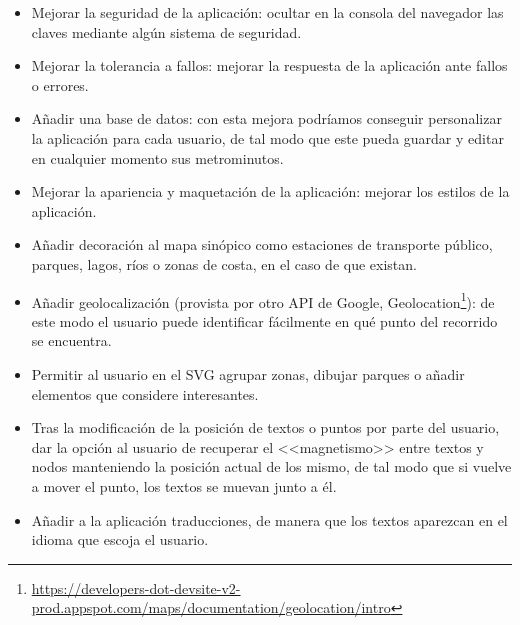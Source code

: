 \begin{itemize}
	\item Mejorar la seguridad de la aplicación: ocultar en la consola del navegador las claves mediante algún sistema de seguridad.
	\item Mejorar la tolerancia a fallos: mejorar la respuesta de la aplicación ante fallos o errores.
	\item Añadir una base de datos: con esta mejora podríamos conseguir personalizar la aplicación para cada usuario, de tal modo que este pueda guardar y editar en cualquier momento sus metrominutos.
	\item Mejorar la apariencia y maquetación de la aplicación: mejorar los estilos de la aplicación.
	\item Añadir decoración al mapa sinópico como estaciones de transporte público, parques, lagos, ríos o zonas de costa, en el caso de que existan.
	\item Añadir geolocalización (provista por otro API de Google, Geolocation\footnote{\url{https://developers-dot-devsite-v2-prod.appspot.com/maps/documentation/geolocation/intro}}): de este modo el usuario puede identificar fácilmente en qué punto del recorrido se encuentra.
	\item Permitir al usuario en el SVG agrupar zonas, dibujar parques o añadir elementos que considere interesantes.
	\item Tras la modificación de la posición de textos o puntos por parte del usuario, dar la opción al usuario de recuperar el <<magnetismo>> entre textos y nodos manteniendo la posición actual de los mismo, de tal modo que si vuelve a mover el punto, los textos se muevan junto a él.
	\item Añadir a la aplicación traducciones, de manera que los textos aparezcan en el idioma que escoja el usuario.
\end{itemize}
